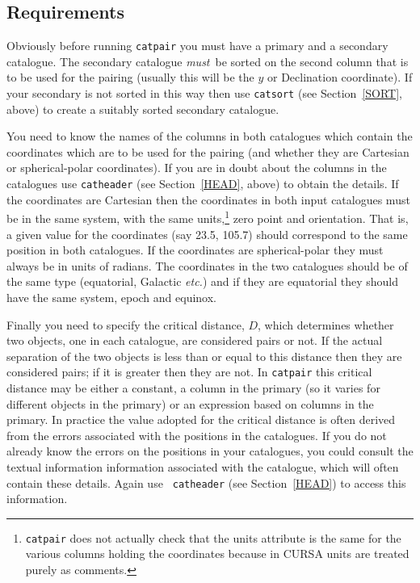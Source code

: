 \documentclass[twoside,11pt]{article}
\renewcommand{\_}{\texttt{\symbol{95}}}
\begin{document}
\subsection{Requirements}

Obviously before running {\tt catpair} you must have a primary and a
secondary catalogue. The secondary catalogue {\it must}\, be sorted on
the second column that is to be used for the pairing (usually this will
be the $y$ or Declination coordinate). If your secondary is not sorted
in this way then use {\tt catsort} (see Section~\ref{SORT}, above) to
create a suitably sorted secondary catalogue.

You need to know the names of the columns in both catalogues which
contain the coordinates which are to be used for the pairing (and whether
they are Cartesian or spherical-polar coordinates). If you are in doubt
about the columns in the catalogues use {\tt catheader} (see
Section~\ref{HEAD}, above) to obtain the details. If the coordinates
are Cartesian then the coordinates in both input catalogues must be in
the same system, with the same units,\footnote{{\tt catpair} does not
actually check that the units attribute is the same for the various
columns holding the coordinates because in CURSA units are treated
purely as comments.} zero point and orientation. That is, a given value
for the coordinates (say 23.5, 105.7) should correspond to the same
position in both catalogues. If the coordinates are spherical-polar
they must always be in units of radians. The coordinates in the two
catalogues should be of the same type (equatorial, Galactic \emph{etc.}\/)
and if they are equatorial they should have the same system, epoch and
equinox.

Finally you need to specify the critical distance, $D$, which determines
whether two objects, one in each catalogue, are considered pairs or not.
If the actual separation of the two objects is less than or equal to
this distance then they are considered pairs; if it is greater then they
are not. In {\tt catpair} this critical distance may be either a
constant, a column in the primary (so it varies for different objects in
the primary) or an expression based on columns in the primary. In
practice the value adopted for the critical distance is often derived
from the errors associated with the positions in the catalogues. If
you do not already know the errors on the positions in your catalogues,
you could consult the textual information information associated with
the catalogue, which will often contain these details. Again use {\tt
catheader} (see Section~\ref{HEAD}) to access this information.
\end{document}
